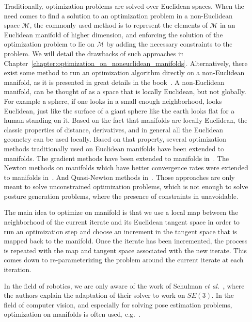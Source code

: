 Traditionally, optimization problems are solved over Euclidean spaces.
When the need comes to find a solution to an optimization problem in a non-Euclidean space $\mathcal{M}$, the commonly used method is to represent the elements of $\mathcal{M}$ in an Euclidean manifold of higher dimension, and enforcing the solution of the optimization problem to lie on $\mathcal{M}$ by adding the necessary constraints to the problem.
We will detail the drawbacks of such approaches in Chapter~\ref{chapter:optimization_on_noneuclidean_manifolds}.
Alternatively, there exist some method to run an optimization algorithm directly on a non-Euclidean manifold, as it is presented in great details in the book~\cite{absil:book:2008}.
A non-Euclidean manifold, can be thought of as a space that is locally Euclidean, but not globally.
For example a sphere, if one looks in a small enough neighborhood, looks Euclidean, just like the surface of a giant sphere like the earth looks flat for a human standing on it.
Based on the fact that manifolds are locally Euclidean, the classic properties of distance, derivatives, and in general all the Euclidean geometry can be used locally.
Based on that property, several optimization methods traditionally used on Euclidean manifolds have been extended to manifolds.
The gradient methods have been extended to manifolds in~\cite{luenberger1972gradient, gabay1982minimizing}.
The Newton methods on manifolds which have better convergence rates were extended to manifolds in~\cite{gabay1982minimizing, stuart1998dynamical, smith2013geometric}.
And Quasi-Newton methods in~\cite{gabay1982minimizing}.
Those approaches are only meant to solve unconstrained optimization problems, which is not enough to solve posture generation problems, where the presence of constraints in unavoidable.

The main idea to optimize on manifold is that we use a local map between the neighborhood of the current iterate and its Euclidean tangent space in order to run an optimization step and choose an increment in the tangent space that is mapped back to the manifold.
Once the iterate has been incremented, the process is repeated with the map and tangent space associated with the new iterate.
This comes down to re-parameterizing the problem around the current iterate at each iteration.

In the field of robotics, we are only aware of the work of Schulman \emph{et al.}~\cite{Schulman2014}, where the authors explain the adaptation of their solver to work on $SE(3)$.
In the field of computer vision, and especially for solving pose estimation problems, optimization on manifolds is often used, e.g.~\cite{hertzberg2011, lu2000fast}.

